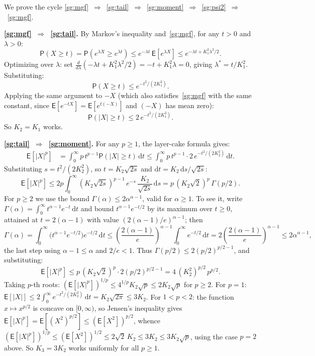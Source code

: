 \documentclass[12pt,a4paper]{article}
\makeatletter
\theoremstyle{definition}
\renewenvironment{proof}[1][\proofname]{\par
  \pushQED{\qed}%
  \normalfont \topsep6\p@\@plus6\p@\relax
  \trivlist
  \item[\hskip\labelsep\bfseries #1\@addpunct{.}]\ignorespaces
}{%
  \popQED\endtrivlist\@endpefalse
}
\newcommand\expc{\mathsf{E}}
\newcommand\prb{\mathsf{P}}
\newcommand{\dd}{\mathrm{d}}
\makeatother
\begin{document}
\begin{proof}
We prove the cycle \ref{sg:mgf}~$\Rightarrow$~\ref{sg:tail}~$\Rightarrow$~\ref{sg:moment}~$\Rightarrow$~\ref{sg:psi2}~$\Rightarrow$~\ref{sg:mgf}.

\medskip\noindent\textbf{\ref{sg:mgf}~$\Rightarrow$~\ref{sg:tail}.} By Markov's inequality and~\ref{sg:mgf}, for any $t > 0$ and $\lambda > 0$:
\[
\prb(X \geqslant t) = \prb(e^{\lambda X} \geqslant e^{\lambda t}) \leqslant e^{-\lambda t}\,\expc[e^{\lambda X}] \leqslant e^{-\lambda t + K_1^2\lambda^2/2}.
\]
Optimizing over $\lambda$: set $\frac{d}{d\lambda}(-\lambda t + K_1^2\lambda^2/2) = -t + K_1^2\lambda = 0$, giving $\lambda^* = t/K_1^2$. Substituting:
\[
\prb(X \geqslant t) \leqslant e^{-t^2/(2K_1^2)}.
\]
Applying the same argument to $-X$ (which also satisfies~\ref{sg:mgf} with the same constant, since $\expc[e^{-tX}] = \expc[e^{t(-X)}]$ and $(-X)$ has mean zero):
\[
\prb(|X| \geqslant t) \leqslant 2\,e^{-t^2/(2K_1^2)}.
\]
So $K_2 = K_1$ works.

\medskip\noindent\textbf{\ref{sg:tail}~$\Rightarrow$~\ref{sg:moment}.} For any $p \geqslant 1$, the layer-cake formula gives:
\begin{align}
\expc[|X|^p] &= \int_0^\infty p\,t^{p-1}\prb(|X| \geqslant t)\,\dd t \leqslant \int_0^\infty p\,t^{p-1} \cdot 2\,e^{-t^2/(2K_2^2)}\,\dd t. \label{eq:layercake}
\end{align}
Substituting $s = t^2/(2K_2^2)$, so $t = K_2\sqrt{2s}$ and $\dd t = K_2\,\dd s/\sqrt{2s}$:
\[
\expc[|X|^p] \leqslant 2p \int_0^\infty (K_2\sqrt{2s})^{p-1}\,e^{-s}\,\frac{K_2}{\sqrt{2s}}\,\dd s = p\,(K_2\sqrt{2})^p\,\Gamma(p/2).
\]
For $p \geqslant 2$ we use the bound $\Gamma(\alpha) \leqslant 2\alpha^{\alpha-1}$, valid for $\alpha \geqslant 1$. To see it, write $\Gamma(\alpha) = \int_0^\infty t^{\alpha-1}e^{-t}\,\dd t$ and bound $t^{\alpha-1}e^{-t/2}$ by its maximum over $t \geqslant 0$, attained at $t = 2(\alpha-1)$ with value $(2(\alpha-1)/e)^{\alpha-1}$; then
\[
\Gamma(\alpha) = \int_0^\infty \!\big(t^{\alpha-1}e^{-t/2}\big)e^{-t/2}\,\dd t \leqslant \left(\frac{2(\alpha-1)}{e}\right)^{\!\alpha-1}\!\int_0^\infty e^{-t/2}\,\dd t = 2\left(\frac{2(\alpha-1)}{e}\right)^{\!\alpha-1} \leqslant 2\alpha^{\alpha-1},
\]
the last step using $\alpha - 1 \leqslant \alpha$ and $2/e < 1$. Thus $\Gamma(p/2) \leqslant 2(p/2)^{p/2-1}$, and substituting:
\[
\expc[|X|^p] \leqslant p\,(K_2\sqrt{2})^p\cdot 2(p/2)^{p/2-1} = 4\,(K_2^2)^{p/2}\,p^{p/2}.
\]
Taking $p$-th roots: $(\expc[|X|^p])^{1/p} \leqslant 4^{1/p}K_2\sqrt{p} \leqslant 2K_2\sqrt{p}$ for $p \geqslant 2$. For $p = 1$: $\expc[|X|] \leqslant 2\int_0^\infty e^{-t^2/(2K_2^2)}\,\dd t = K_2\sqrt{2\pi} \leqslant 3K_2$. For $1 < p < 2$: the function $x \mapsto x^{p/2}$ is concave on $[0,\infty)$, so Jensen's inequality gives $\expc[|X|^p] = \expc[(X^2)^{p/2}] \leqslant (\expc[X^2])^{p/2}$, whence $(\expc[|X|^p])^{1/p} \leqslant (\expc[X^2])^{1/2} \leqslant 2\sqrt{2}\,K_2 \leqslant 3K_2 \leqslant 3K_2\sqrt{p}$, using the case $p = 2$ above. So $K_3 = 3K_2$ works uniformly for all $p \geqslant 1$.


\end{proof}
\end{document}
